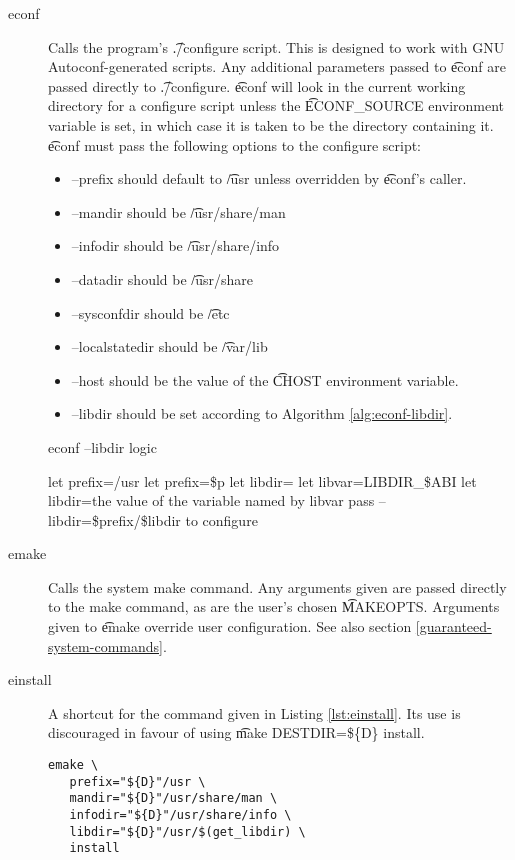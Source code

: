 \begin{description}
\item[econf] Calls the program's \t{./configure} script. This is designed to work with GNU
    Autoconf-generated scripts. Any additional parameters passed to \t{econf} are passed directly
    to \t{./configure}. \t{econf} will look in the current working directory for a configure script
    unless the \t{ECONF\_SOURCE} environment variable is set, in which case it is taken to be the
    directory containing it. \t{econf} must pass the following options to the configure script:
    \begin{itemize}
    \item --prefix should default to \t{/usr} unless overridden by \t{econf}'s caller.
    \item --mandir should be \t{/usr/share/man}
    \item --infodir should be \t{/usr/share/info}
    \item --datadir should be \t{/usr/share}
    \item --sysconfdir should be \t{/etc}
    \item --localstatedir should be \t{/var/lib}
    \item --host should be the value of the \t{CHOST} environment variable.
    \item --libdir should be set according to Algorithm \ref{alg:econf-libdir}.
    \end{itemize}

\begin{algorithm}
\caption{econf --libdir logic} \label{alg:econf-libdir}
\begin{algorithmic}[1]
\STATE let prefix=/usr
    \STATE let prefix=\$p
\ENDIF
\STATE let libdir=
    \STATE let libvar=LIBDIR\_\$ABI
        \STATE let libdir=the value of the variable named by libvar
    \ENDIF
\ENDIF
{}
    \STATE pass --libdir=\$prefix/\$libdir to configure
\ENDIF
\end{algorithmic}
\end{algorithm}

\item[emake] Calls the system make command. Any arguments given are passed directly to the make
    command, as are the user's chosen \t{MAKEOPTS}. Arguments given to \t{emake} override user
    configuration. See also section \ref{guaranteed-system-commands}.
\item[einstall] A shortcut for the command given in Listing \ref{lst:einstall}. Its use is
    discouraged in favour of using \t{make DESTDIR=\$\{D\} install}.

\begin{lstlisting}[caption=einstall command,label=lst:einstall]
emake \
   prefix="${D}"/usr \
   mandir="${D}"/usr/share/man \
   infodir="${D}"/usr/share/info \
   libdir="${D}"/usr/$(get_libdir) \
   install
\end{lstlisting}

\end{description}

